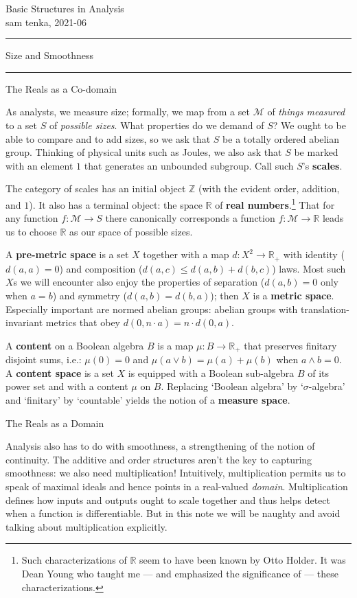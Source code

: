 \documentclass[12pt]{article}
\newcommand{\Mm}{\mathcal{M}}
\newcommand{\ZZ}{\mathbb{Z}}
\newcommand{\RR}{\mathbb{R}}
\newcommand{\mootitle}[2]{
  \begin{center}
    \LARGE\sc#1\\
    \Large\rm#2
  \end{center}
}
\newcommand{\moosection}[1]{
  \begin{center}\parbox{\textwidth}{\begin{center}
    \hrule\vspace{0.25cm}
    \Large\sc#1\vspace{0.25cm}
    \hrule
  \end{center}}\end{center}
}
\newcommand{\mooparagraph}[1]{
  \begin{center}\parbox{8cm}{\begin{center}
    \large\sc#1\vspace{-0.25cm}
  \end{center}}\end{center}
}
\begin{document}
  \pagecolor{yellow!10}

  \mootitle{Basic Structures in Analysis}{sam tenka, 2021-06}
    
  \moosection{Size and Smoothness}
    \mooparagraph{The Reals as a Co-domain}
      As analysts, we measure size; formally, we map from a set $\Mm$ of
      \emph{things measured} to a set $S$ of \emph{possible sizes}.
      What properties do we demand of $S$?  We ought to be able to compare and
      to add sizes, so we ask that $S$ be a totally ordered abelian group.  
      Thinking of physical units such as Joules, we also ask that $S$ be
      marked with an element $1$ that generates an unbounded subgroup.  Call
      such $S$'s \textbf{scales}.

      The category of scales has an initial object
      $\ZZ$ (with the evident order, addition, and $1$).  It also has a
      terminal object: the space $\RR$ of \textbf{real numbers}.\footnote{ 
        Such characterizations of $\RR$ seem to have been known by Otto Holder.
        It was Dean Young who taught me --- and emphasized the significance of
        --- these characterizations.
      }
      That for any function $f:\Mm\to S$ there canonically corresponds a
      function $f:\Mm\to \RR$ leads us to choose $\RR$ as our space of possible
      sizes.

      A \textbf{pre-metric space}
      is a set $X$ together with a map
      $d:X^2\to \RR_+$
      with identity ($d(a,a)=0$) and composition ($d(a,c)\leq d(a,b)+d(b,c)$) 
      laws.
      Most such $X$s we will encounter also enjoy the
      properties of separation ($d(a,b)=0$ only when $a=b$)
      and symmetry ($d(a,b)=d(b,a)$); then $X$ is a
      \textbf{metric space}.
      Especially important are normed abelian groups:
      abelian groups with translation-invariant metrics
      that obey $d(0,n\cdot a) = n\cdot d(0, a)$.
     
      A \textbf{content} on a Boolean algebra $B$ is a map
      $\mu:B\to \RR_+$ that preserves finitary disjoint sums, i.e.:
      $\mu(0)=0$ and $\mu(a\vee b)=\mu(a)+\mu(b)$ when $a\wedge b=0$.
      A \textbf{content space} is a set $X$ is equipped with a Boolean
      sub-algebra $B$ of its power set and with a content $\mu$ on $B$.
      Replacing `Boolean algebra' by `$\sigma$-algebra' and `finitary' by `countable'
      yields the notion of a \textbf{measure space}.

    \mooparagraph{The Reals as a Domain}
      Analysis also has to do with smoothness, a strengthening of the notion of
      continuity.  The additive and order structures aren't the key to
      capturing smoothness: we also need multiplication!  Intuitively,
      multiplication permits us to speak of maximal ideals and hence points in
      a real-valued \emph{domain}.  Multiplication defines
      how inputs and outputs ought to scale together and thus helps detect when
      a function is differentiable.  But in this note we will be naughty and
      avoid talking about multiplication explicitly.
\end{document}

